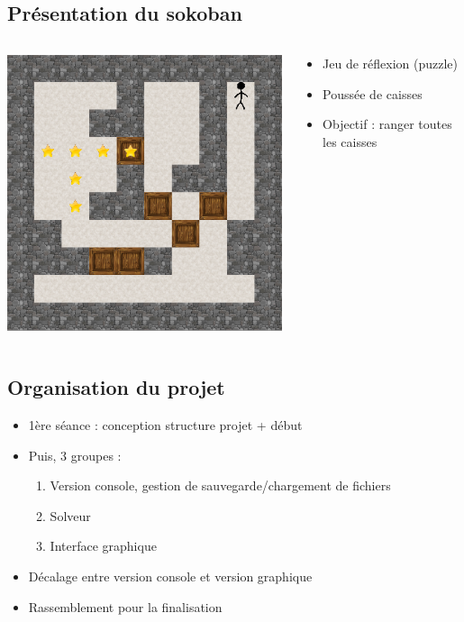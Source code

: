 \documentclass{beamer}
\begin{document}
\subsection{Présentation du sokoban}
\begin{frame} %
\begin{columns}
\hspace{0.5cm}
\begin{column}{5cm}
\includegraphics[scale=0.3]{images/sokoban.png}
\end{column}
\begin{column}{6cm}
\begin{itemize}
\item Jeu de réflexion (puzzle)
\item Poussée de caisses
\item Objectif : ranger toutes les caisses
\end{itemize}
\end{column}
\end{columns}
\end{frame}

\subsection{Organisation du projet}
\begin{frame}
\begin{itemize}
\item 1ère séance : conception structure projet + début
\item Puis, 3 groupes :
\begin{enumerate}
\item Version console, gestion de sauvegarde/chargement de fichiers
\item Solveur
\item Interface graphique
\end{enumerate}
\item Décalage entre version console et version graphique
\item Rassemblement pour la finalisation
\end{itemize}
\end{frame}
\end{document}
